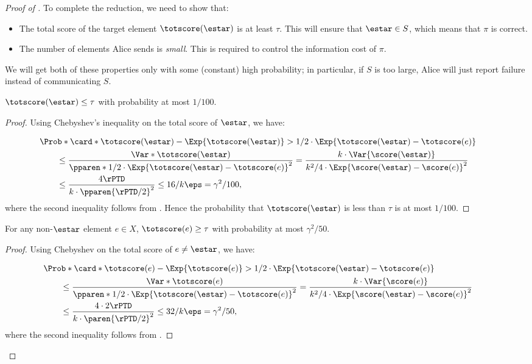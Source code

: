 \begin{proof}[Proof of ]
To complete the reduction, we need to show that:
\begin{itemize}
  \item The total score of the target element $\totscore(\estar)$ is at least
    $\tau$.
    This will ensure that $\estar \in S$, which means that $\pi$ is correct.
  \item The number of elements Alice sends is \emph{small}.
    This is required to control the information cost of $\pi$.
\end{itemize}
We will get both of these properties only with some (constant) high probability;
in particular, if $S$ is too large, Alice will just report failure instead
of communicating $S$.

\begin{claim}
  $\totscore(\estar) \leq \tau$ with probability at most $1 / 100$.
\end{claim}

\begin{proof}
Using Chebyshev's inequality on the total score of $\estar$, we have:

\begin{align*}
  &\mkern-36mu\Prob*{ \card*{\totscore(\estar) - \Exp{\totscore(\estar)}}
  > 1/2 \cdot \Exp{\totscore(\estar) - \totscore(e)} } \\
  &\leq \frac{ \Var*{\totscore(\estar)} }{\pparen*{1/2 \cdot \Exp{\totscore(\estar) - \totscore(e)}}^2}
  = \frac{k \cdot \Var{\score(\estar)}}{k^2 / 4 \cdot \Exp{\score(\estar) - \score(e)}^2}\\
  &\leq \frac{4\rPTD}{k\cdot\pparen{\rPTD/2}^2}
  \leq 16 / k\eps = \gamma^2/100,
\end{align*}
where the second inequality follows from .
Hence the probability that $\totscore(\estar)$ is less than $\tau$ is at most
$1/ 100$.
\end{proof}

\begin{claim}
  For any non-$\estar$ element $e \in X$, $\totscore(e) \geq \tau$ with
  probability at most $\gamma^2 / 50$.
\end{claim}

\begin{proof}
Using Chebyshev on the total score of $e \neq \estar$, we have:

\begin{align*}
  &\mkern-36mu\Prob*{ \card*{\totscore(e) - \Exp{\totscore(e)}}
  > 1/2 \cdot \Exp{\totscore(\estar) - \totscore(e)} } \\
  &\leq \frac{ \Var*{\totscore(e)} }{\pparen*{1/2 \cdot \Exp{\totscore(\estar) - \totscore(e)}}^2}
  = \frac{k \cdot \Var{\score(e)}}{k^2 / 4 \cdot \Exp{\score(\estar) - \score(e)}^2}\\
  &\leq \frac{4 \cdot 2\rPTD}{k \cdot \paren{\rPTD / 2}^2}
  \leq 32 / k\eps = \gamma^2/50,
\end{align*}
where the second inequality follows from .
\end{proof}


\end{proof}
